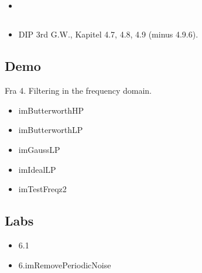 \subsection{\subtopics}

\begin{itemize}
	\item 
\end{itemize}

\subsection{\curriculum}

\begin{itemize}
	\item DIP 3rd G.W., Kapitel 4.7, 4.8, 4.9 (minus 4.9.6).
\end{itemize}

\subsection{Demo}

Fra 4. Filtering in the frequency domain.

\begin{itemize}
	\item imButterworthHP
	\item imButterworthLP
	\item imGaussLP
	\item imIdealLP
	\item imTestFreqz2
\end{itemize}

\subsection{Labs}

\begin{itemize}
	\item 6.1
	\item 6.imRemovePeriodicNoise
\end{itemize}
